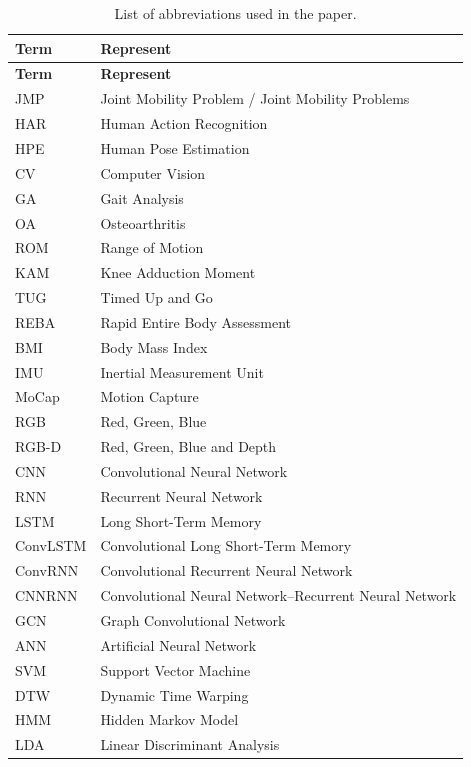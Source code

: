 \documentclass[12pt]{elsarticle}
\begin{document}
{\scriptsize
\setlength{\tabcolsep}{6pt}
\renewcommand{\arraystretch}{1.12}
\setlength\LTleft{\fill}
\setlength\LTright{\fill}

\begin{longtable}{p{3cm} p{10.5cm}}
\caption{List of abbreviations used in the paper.}
\label{tab:abbreviations}\\
\hline
\textbf{Term} & \textbf{Represent} \\
\hline
\endfirsthead

\hline
\textbf{Term} & \textbf{Represent} \\
\hline
\endhead

JMP & Joint Mobility Problem / Joint Mobility Problems \\
HAR & Human Action Recognition \\
HPE & Human Pose Estimation \\
CV & Computer Vision \\
GA & Gait Analysis \\
OA & Osteoarthritis \\
ROM & Range of Motion \\
KAM & Knee Adduction Moment \\
TUG & Timed Up and Go \\
REBA & Rapid Entire Body Assessment \\
BMI & Body Mass Index \\
IMU & Inertial Measurement Unit \\
MoCap & Motion Capture \\
RGB & Red, Green, Blue \\
RGB-D & Red, Green, Blue and Depth \\
CNN & Convolutional Neural Network \\
RNN & Recurrent Neural Network \\
LSTM & Long Short-Term Memory \\
ConvLSTM & Convolutional Long Short-Term Memory \\
ConvRNN & Convolutional Recurrent Neural Network \\
CNNRNN & Convolutional Neural Network--Recurrent Neural Network \\
GCN & Graph Convolutional Network \\
ANN & Artificial Neural Network \\
SVM & Support Vector Machine \\
DTW & Dynamic Time Warping \\
HMM & Hidden Markov Model \\
LDA & Linear Discriminant Analysis \\

\end{longtable}}
\end{document}
